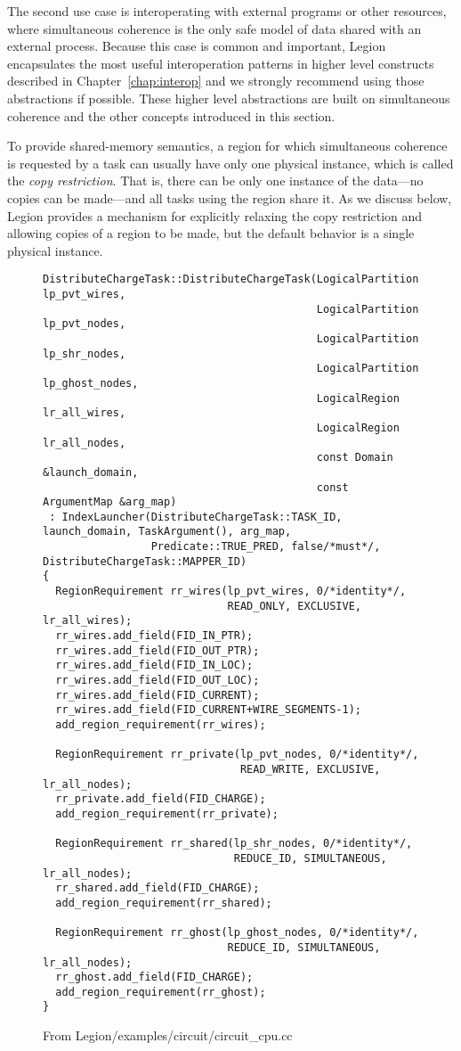 The second use case is interoperating with external programs or other resources, where simultaneous coherence is the only safe model of data shared with an external process.
Because this case is common and important, Legion encapsulates the most useful interoperation patterns in higher level constructs described in Chapter~\ref{chap:interop} and we strongly
recommend using those abstractions if possible.
These higher level abstractions are built on simultaneous coherence and the other concepts introduced in this section.

To provide shared-memory semantics, a region for which simultaneous
coherence is requested by a task can usually have only one physical instance,
which is called the {\em copy restriction}.  That is, there can be only
one instance of the data---no copies can be made---and all tasks using the
region share it.  As we discuss below, Legion provides a mechanism for
explicitly relaxing the copy restriction and allowing copies of a
region to be made, but the default behavior is a single physical
instance.  

\begin{figure}
  {\small
\begin{lstlisting}
DistributeChargeTask::DistributeChargeTask(LogicalPartition lp_pvt_wires,
                                           LogicalPartition lp_pvt_nodes,
                                           LogicalPartition lp_shr_nodes,
                                           LogicalPartition lp_ghost_nodes,
                                           LogicalRegion lr_all_wires,
                                           LogicalRegion lr_all_nodes,
                                           const Domain &launch_domain,
                                           const ArgumentMap &arg_map)
 : IndexLauncher(DistributeChargeTask::TASK_ID, launch_domain, TaskArgument(), arg_map,
                 Predicate::TRUE_PRED, false/*must*/, DistributeChargeTask::MAPPER_ID)
{
  RegionRequirement rr_wires(lp_pvt_wires, 0/*identity*/,
                             READ_ONLY, EXCLUSIVE, lr_all_wires);
  rr_wires.add_field(FID_IN_PTR);
  rr_wires.add_field(FID_OUT_PTR);
  rr_wires.add_field(FID_IN_LOC);
  rr_wires.add_field(FID_OUT_LOC);
  rr_wires.add_field(FID_CURRENT);
  rr_wires.add_field(FID_CURRENT+WIRE_SEGMENTS-1);
  add_region_requirement(rr_wires);

  RegionRequirement rr_private(lp_pvt_nodes, 0/*identity*/,
                               READ_WRITE, EXCLUSIVE, lr_all_nodes);
  rr_private.add_field(FID_CHARGE);
  add_region_requirement(rr_private);

  RegionRequirement rr_shared(lp_shr_nodes, 0/*identity*/,
                              REDUCE_ID, SIMULTANEOUS, lr_all_nodes);
  rr_shared.add_field(FID_CHARGE);
  add_region_requirement(rr_shared);

  RegionRequirement rr_ghost(lp_ghost_nodes, 0/*identity*/,
                             REDUCE_ID, SIMULTANEOUS, lr_all_nodes);
  rr_ghost.add_field(FID_CHARGE);
  add_region_requirement(rr_ghost);
}
\end{lstlisting}
  }
  \caption{From Legion/examples/circuit/circuit\_cpu.cc}
  \label{fig:simul}
\end{figure}

